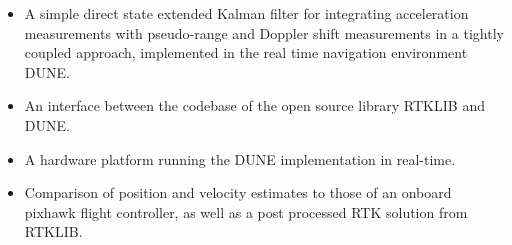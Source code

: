 \begin{itemize}
    \item A simple direct state extended Kalman filter for integrating acceleration measurements with pseudo-range and Doppler shift measurements in a tightly coupled approach, implemented in the real time navigation environment DUNE.
    \item An interface between the codebase of the open source library RTKLIB and DUNE.
    \item A hardware platform running the DUNE implementation in real-time.
    \item Comparison of position and velocity estimates to those of an onboard pixhawk flight controller, as well as a post processed RTK solution from RTKLIB.
    
\end{itemize}


    


